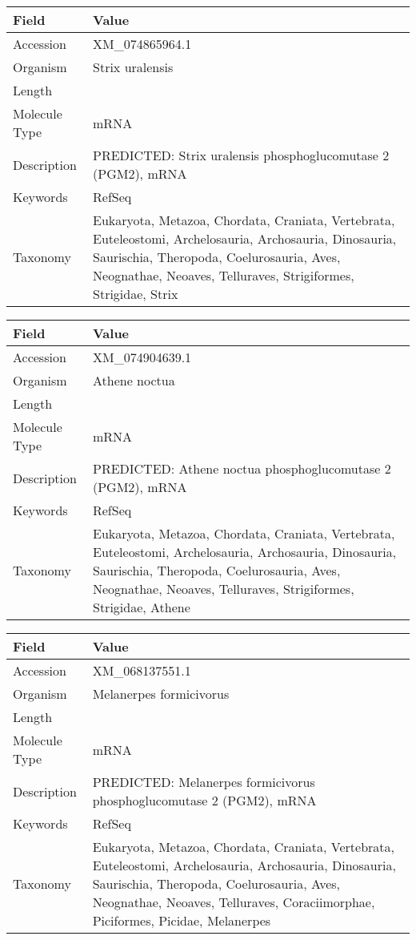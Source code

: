 \documentclass[10pt]{article}
\begin{document}
{\footnotesize
\begin{longtable}{>{\raggedright\arraybackslash}p{4.5cm} >{\raggedright\arraybackslash}p{11.5cm}}
\textbf{Field} & \textbf{Value} \\
\hline
Accession & XM\_074865964.1 \\
Organism & Strix uralensis \\
Length & 2219 \\
Molecule Type & mRNA \\
Description & PREDICTED: Strix uralensis phosphoglucomutase 2 (PGM2), mRNA \\
Keywords & RefSeq \\
Taxonomy & Eukaryota, Metazoa, Chordata, Craniata, Vertebrata, Euteleostomi, Archelosauria, Archosauria, Dinosauria, Saurischia, Theropoda, Coelurosauria, Aves, Neognathae, Neoaves, Telluraves, Strigiformes, Strigidae, Strix \\
\end{longtable}
}

{\footnotesize
\begin{longtable}{>{\raggedright\arraybackslash}p{4.5cm} >{\raggedright\arraybackslash}p{11.5cm}}
\textbf{Field} & \textbf{Value} \\
\hline
Accession & XM\_074904639.1 \\
Organism & Athene noctua \\
Length & 2166 \\
Molecule Type & mRNA \\
Description & PREDICTED: Athene noctua phosphoglucomutase 2 (PGM2), mRNA \\
Keywords & RefSeq \\
Taxonomy & Eukaryota, Metazoa, Chordata, Craniata, Vertebrata, Euteleostomi, Archelosauria, Archosauria, Dinosauria, Saurischia, Theropoda, Coelurosauria, Aves, Neognathae, Neoaves, Telluraves, Strigiformes, Strigidae, Athene \\
\end{longtable}
}

{\footnotesize
\begin{longtable}{>{\raggedright\arraybackslash}p{4.5cm} >{\raggedright\arraybackslash}p{11.5cm}}
\textbf{Field} & \textbf{Value} \\
\hline
Accession & XM\_068137551.1 \\
Organism & Melanerpes formicivorus \\
Length & 2173 \\
Molecule Type & mRNA \\
Description & PREDICTED: Melanerpes formicivorus phosphoglucomutase 2 (PGM2), mRNA \\
Keywords & RefSeq \\
Taxonomy & Eukaryota, Metazoa, Chordata, Craniata, Vertebrata, Euteleostomi, Archelosauria, Archosauria, Dinosauria, Saurischia, Theropoda, Coelurosauria, Aves, Neognathae, Neoaves, Telluraves, Coraciimorphae, Piciformes, Picidae, Melanerpes \\
\end{longtable}
}
\end{document}
